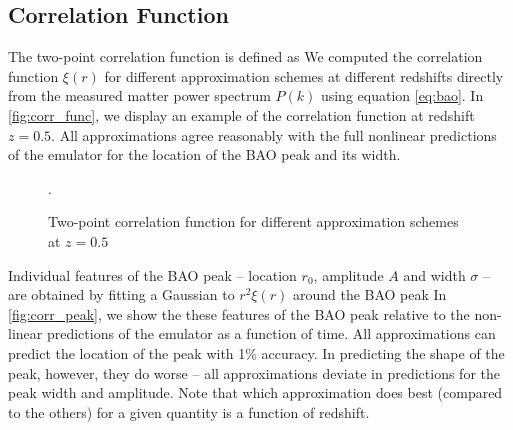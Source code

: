 \subsection{Correlation Function}
\label{sec:corr}
The two-point correlation function is defined as
We computed the correlation function $\xi(r)$ for different approximation schemes at different redshifts directly from the measured matter power spectrum $P(k)$ using equation \eqref{eq:bao}. In \autoref{fig:corr_func}, we display an example of the correlation function at redshift $z=0.5$. All approximations agree reasonably with the full nonlinear predictions of the emulator for the location of the BAO peak and its width.
\begin{figure}
\centering
	\begin{subfigure}{\textwidth}
	\end{subfigure}
	\begin{subfigure}{\textwidth}
		\centering
	\end{subfigure}
	\caption{Two-point correlation function for different approximation schemes at $z=0.5$}.
	\label{fig:corr_func}
\end{figure}

Individual features of the BAO peak -- location $r_0$, amplitude $A$ and width $\sigma$ -- are obtained by fitting a Gaussian to $r^2\xi(r)$ around the BAO peak
In \autoref{fig:corr_peak}, we show the these features of the BAO peak relative to the non-linear predictions of the emulator as a function of time. All approximations can predict the location of the peak with 1\% accuracy. In predicting the shape of the peak, however, they do worse -- all approximations deviate in predictions for the peak width and amplitude. Note that which approximation does best (compared to the others) for a given quantity is a function of redshift.


